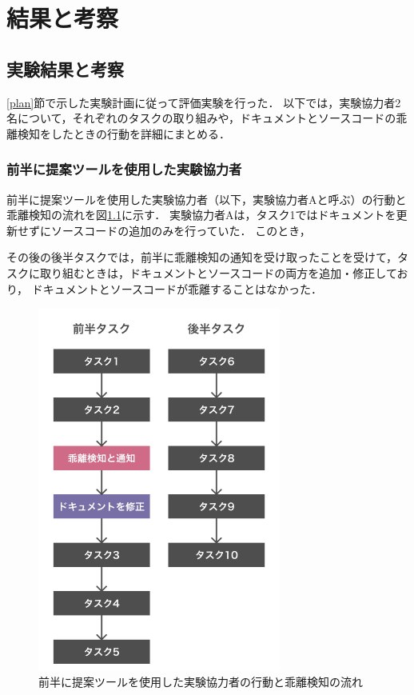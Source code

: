\chapter{結果と考察}

\section{実験結果と考察}
\ref{plan}節で示した実験計画に従って評価実験を行った．
以下では，実験協力者2名について，それぞれのタスクの取り組みや，ドキュメントとソースコードの乖離検知をしたときの行動を詳細にまとめる．

\subsection{前半に提案ツールを使用した実験協力者}
前半に提案ツールを使用した実験協力者（以下，実験協力者Aと呼ぶ）の行動と乖離検知の流れを図\ref{usera}に示す．
実験協力者Aは，タスク1ではドキュメントを更新せずにソースコードの追加のみを行っていた．
このとき，


その後の後半タスクでは，前半に乖離検知の通知を受け取ったことを受けて，タスクに取り組むときは，ドキュメントとソースコードの両方を追加・修正しており，
ドキュメントとソースコードが乖離することはなかった．

\begin{figure}[H]
    \centering
    \includegraphics[width=8cm]{images/UserA.png}
    \caption{前半に提案ツールを使用した実験協力者の行動と乖離検知の流れ}
    \label{usera}
\end{figure}

